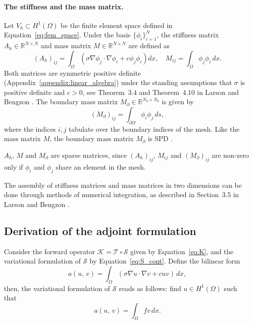 \paragraph{The stiffness and the mass matrix.}\label{appendix:stiffness}%
Let $V_h \subset H^1(\Omega)$ be the finite element space defined in Equation~\eqref{eq:fem_space}. Under the basis $\{\phi_i\}_{i=1}^N$, the stiffness matrix $A_h \in \mathbb{R}^{N \times N}$ and mass matrix $M \in \mathbb{R}^{N \times N}$ are defined as
\begin{equation*}
    (A_h)_{ij} = \int_\Omega 
    \left( \sigma \nabla \phi_j \cdot \nabla \phi_i 
    + c \phi_j \phi_i \right) dx,
    \quad
    M_{ij} = \int_\Omega \phi_j \phi_i \, dx.
\end{equation*}
Both matrices are symmetric positive definite (Appendix~\ref{appendix:linear_algebra}) under the standing assumptions that $\sigma$ is positive definite and $c > 0$, see Theorem~3.4 and Theorem~4.10 in Larson and Bengzon \cite{larsonFiniteElementMethod2013}. The boundary mass matrix $M_\partial \in \mathbb{R}^{N_b \times N_b}$ is given by
\begin{equation*}
    (M_\partial)_{ij} = \int_{\partial\Omega} \phi_i \phi_j \, ds,
\end{equation*}
where the indices $i, j$ tabulate over the boundary indices of the mesh. Like the mass matrix $M$, the boundary mass matrix $M_\partial$ is SPD \cite{larsonFiniteElementMethod2013}.

$A_h$, $M$ and $M_\partial$ are sparse matrices, since $(A_h)_{ij}$, $M_{ij}$ and $(M_\partial)_{ij}$ are non-zero only if $\phi_i$ and $\phi_j$ share an element in the mesh.

The assembly of stiffness matrices and mass matrices in two dimensions can be done through methods of numerical integration, as described in Section~3.5 in Larson and Bengzon \cite{larsonFiniteElementMethod2013}.


\subsection{Derivation of the adjoint formulation}\label{appendix:adjoint_derivation}
Consider the forward operator $\mathcal{K} = \mathcal{T} \circ \mathcal{S}$ given by Equation~\eqref{eq:K}, and the variational formulation of $\mathcal{S}$ by Equation~\eqref{eq:S_cont}. Define the bilinear form
\begin{equation*}
    a(u,\, v) =
    \int_\Omega (\sigma \nabla u \cdot \nabla v + c u v) \, dx,
\end{equation*}
then, the variational formulation of $\mathcal{S}$ reads as follows: find $u \in H^1(\Omega)$ such that
\begin{equation}\label{eq:bilinear_form}
    a(u,\, v) = \int_\Omega f v \, dx.
\end{equation}

